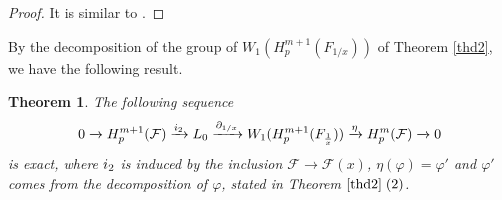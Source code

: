 \documentclass[times,10pt]{amsart}
\newcommand{\F}{\ensuremath{\mathcal{F}}}
\renewcommand{\phi}{\varphi}
\newtheorem{thm}{Theorem}[section]
\begin{document}
\begin{proof}
     It is similar to \cite[Theorem 4.15]{ex}.
\end{proof}
By the decomposition of the group of $W_1(H_p^{m+1}(F_{1/x}))$ of Theorem \ref{thd2}, we have the following result. 
\begin{thm}
    \label{ssec}The following  sequence  
      \[ 0\xrightarrow{} H_p^{m+1}(\mathcal{F}) \xrightarrow{\textcolor{black}{i_2}}L_0\xrightarrow{\textcolor{black}{\partial_{1/x}}} W_1( H_p^{m+1}(F_{\frac{1}{x}}))\xrightarrow{\eta} H_p^{m}(\mathcal{F})\xrightarrow{} 0 \] is  exact, where $\textcolor{black}{i_2}$  is induced by the  inclusion $\F\xrightarrow{} \F(x)$,   $ \eta(\phi)= \phi'$ and $\phi'$  comes from the decomposition of $\phi$, stated in   Theorem  $\ref{thd2}\hspace{1mm} (2)$.  
\end{thm}
\end{document}
